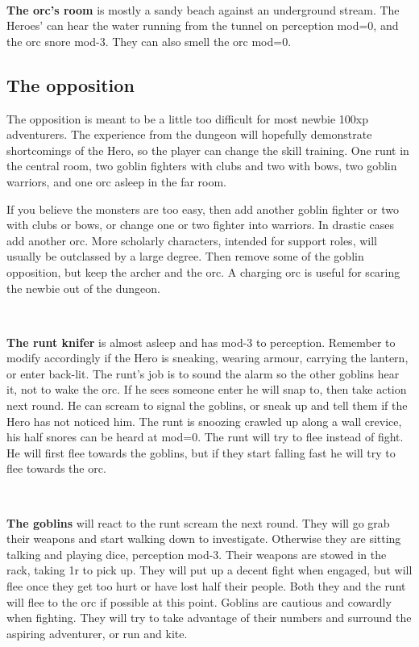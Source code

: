 \

\textbf{The orc's room} is mostly a sandy beach against an underground stream. The Heroes' can hear the water running from the tunnel on perception mod=0, and the orc snore mod-3. They can also smell the orc mod=0.



\subsection*{The opposition}

The opposition is meant to be a little too difficult for most newbie 100xp adventurers. The experience from the dungeon will hopefully demonstrate shortcomings of the Hero, so the player can change the skill training.
One runt in the central room, two goblin fighters with clubs and two with bows, two goblin warriors, and one orc asleep in the far room.

If you believe the monsters are too easy, then add another goblin fighter or two with clubs or bows, or change one or two fighter into warriors. In drastic cases add another orc.
More scholarly characters, intended for support roles, will usually be outclassed by a large degree. Then remove some of the goblin opposition, but keep the archer and the orc. A charging orc is useful for scaring the newbie out of the dungeon.

\

\textbf{The runt knifer} is almost asleep and has mod-3 to perception. Remember to modify accordingly if the Hero is sneaking, wearing armour, carrying the lantern, or enter back-lit. The runt's job is to sound the alarm so the other goblins hear it, not to wake the orc. If he sees someone enter he will snap to, then take action next round. He can scream to signal the goblins, or sneak up and tell them if the Hero has not noticed him. The runt is snoozing crawled up along a wall crevice, his half snores can be heard at mod=0.
The runt will try to flee instead of fight. He will first flee towards the goblins, but if they start falling fast he will try to flee towards the orc.

\

\textbf{The goblins} will react to the runt scream the next round. They will go grab their weapons and start walking down to investigate. Otherwise they are sitting talking and playing dice, perception mod-3. Their weapons are stowed in the rack, taking 1r to pick up.
They will put up a decent fight when engaged, but will flee once they get too hurt or have lost half their people. Both they and the runt will flee to the orc if possible at this point.
Goblins are cautious and cowardly when fighting. They will try to take advantage of their numbers and surround the aspiring adventurer, or run and kite.

